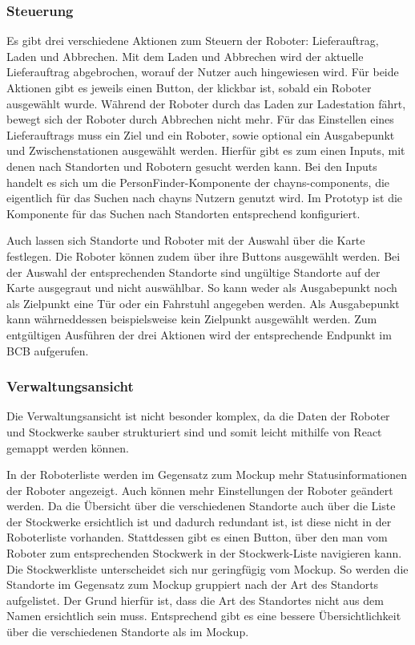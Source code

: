 \subsubsection{Steuerung}
Es gibt drei verschiedene Aktionen zum Steuern der Roboter: Lieferauftrag, Laden und Abbrechen. Mit dem Laden und Abbrechen wird der aktuelle Lieferauftrag abgebrochen, worauf der Nutzer auch hingewiesen wird. Für beide Aktionen gibt es jeweils einen Button, der klickbar ist, sobald ein Roboter ausgewählt wurde. Während der Roboter durch das Laden zur Ladestation fährt, bewegt sich der Roboter durch Abbrechen nicht mehr. Für das Einstellen eines Lieferauftrags muss ein Ziel und ein Roboter, sowie optional ein Ausgabepunkt und Zwischenstationen ausgewählt werden. Hierfür gibt es zum einen Inputs, mit denen nach Standorten und Robotern gesucht werden kann. Bei den Inputs handelt es sich um die PersonFinder-Komponente der chayns-components, die eigentlich für das Suchen nach chayns Nutzern genutzt wird. Im Prototyp ist die Komponente für das Suchen nach Standorten entsprechend konfiguriert.

Auch lassen sich Standorte und Roboter mit der Auswahl über die Karte festlegen. Die Roboter können zudem über ihre Buttons ausgewählt werden. Bei der Auswahl der entsprechenden Standorte sind ungültige Standorte auf der Karte ausgegraut und nicht auswählbar. So kann weder als Ausgabepunkt noch als Zielpunkt eine Tür oder ein Fahrstuhl angegeben werden. Als Ausgabepunkt kann währneddessen beispielsweise kein Zielpunkt ausgewählt werden. Zum entgültigen Ausführen der drei Aktionen wird der entsprechende Endpunkt im \ac{BCB} aufgerufen.

\subsubsection{Verwaltungsansicht}
Die Verwaltungsansicht ist nicht besonder komplex, da die Daten der Roboter und Stockwerke sauber strukturiert sind und somit leicht mithilfe von React gemappt werden können.

In der Roboterliste werden im Gegensatz zum Mockup mehr Statusinformationen der Roboter angezeigt. Auch können mehr Einstellungen der Roboter geändert werden. Da die Übersicht über die verschiedenen Standorte auch über die Liste der Stockwerke ersichtlich ist und dadurch redundant ist, ist diese nicht in der Roboterliste vorhanden. Stattdessen gibt es einen Button, über den man vom Roboter zum entsprechenden Stockwerk in der Stockwerk-Liste navigieren kann. Die Stockwerkliste unterscheidet sich nur geringfügig vom Mockup. So werden die Standorte im Gegensatz zum Mockup gruppiert nach der Art des Standorts aufgelistet. Der Grund hierfür ist, dass die Art des Standortes nicht aus dem Namen ersichtlich sein muss. Entsprechend gibt es eine bessere Übersichtlichkeit über die verschiedenen Standorte als im Mockup.

